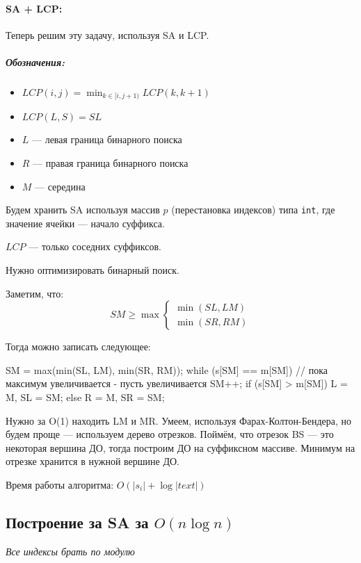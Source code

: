 \paragraph{SA + LCP:}

Теперь решим эту задачу, используя SA и LCP.

\subparagraph{Обозначения:}
\begin{itemize}
	\item	$LCP(i, j) = \min_{k \in [i, j + 1)} LCP(k, k + 1)$
	\item $LCP(L, S) = SL$	
	\item $L$ --- левая граница бинарного поиска
	\item $R$ --- правая граница бинарного поиска
	\item $M$ --- середина
\end{itemize}

Будем хранить SA используя массив $p$ (перестановка индексов) типа \texttt{int}, где значение ячейки --- начало суффикса.

$LCP$ --- только соседних суффиксов.

Нужно оптимизировать бинарный поиск.

Заметим, что:
 \begin{equation*}
	SM \geq \max
		 \begin{cases}
		  	\min(SL, LM) \\
		   	\min(SR, RM)
		 \end{cases}
\end{equation*}
 
Тогда можно записать следующее:

\begin{cppcode} 
 SM = max(min(SL, LM), min(SR, RM));
 while (s[SM] == m[SM]) {	// пока максимум увеличивается - пусть увеличивается
 	SM++;	
 	if (s[SM] > m[SM])
 		L = M, SL = SM;
 	else
 		R = M, SR = SM;
 }
 \end{cppcode}
 
Нужно за O(1) находить LM и MR. Умеем, используя Фарах-Колтон-Бендера, но будем проще --- используем дерево отрезков.
Поймём, что отрезок BS --- это некоторая вершина ДО, тогда построим ДО на суффиксном массиве. Минимум на отрезке хранится в нужной вершине ДО.

Время работы алгоритма: $O(|s_i| + \log |text|)$

\subsection{Построение за SA за $O(n \log n)$} 
\textit{Все индексы брать по модулю}


